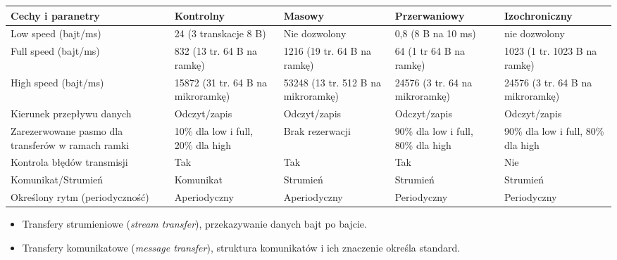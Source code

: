 		\begin{table}[h]
			\begin{tabular}{|p{4cm}|p{3cm}|p{3cm}|p{3cm}|p{3cm}|}
				\hline
				\textbf{Cechy i paranetry} & \textbf{Kontrolny}	   & \textbf{Masowy} & \textbf{Przerwaniowy} & \textbf{Izochroniczny} \\ \hline
				Low speed (bajt/ms)  & 24 (3 transkacje 8 B)        & Nie dozwolony      			& 0,8 (8 B na 10 ms)		& nie dozwolony						\\ \hline
				Full speed (bajt/ms) & 832 (13 tr. 64 B na ramkę)   & 1216 (19 tr. 64 B na ramkę)   & 64 (1 tr 64 B na ramkę)	& 1023 (1 tr. 1023 B na ramkę)		\\ \hline
				High speed (bajt/ms) & 15872 (31 tr. 64 B na mikroramkę) & 53248 (13 tr. 512 B na mikroramkę) & 24576 (3 tr. 64 na mikroramkę)	& 24576 (3 tr. 64 B na mikroramkę)	\\ \hline
				Kierunek przepływu danych & Odczyt/zapis            & Odczyt/zapis       			& Odczyt/zapis		& Odczyt/zapis					\\ \hline
				Zarezerwowane pasmo  dla transferów w ramach ramki & 10\% dla low i full, 20\% dla high   & Brak rezerwacji  & 90\% dla low i full, 80\% dla high	& 90\% dla low i full, 80\% dla high	\\ \hline
				Kontrola błędów transmisji & Tak                	& Tak & Tak	& Nie	\\ \hline
				Komunikat/Strumień  & Komunikat		               & Strumień & Strumień   & Strumień	\\ \hline
				Określony rytm (periodyczność) & Aperiodyczny        & Aperiodyczny    & Periodyczny   & Periodyczny	\\ \hline
				\end{tabular}
		\end{table}
				\begin{itemize}
					\item Transfery strumieniowe (\emph{stream transfer}), przekazywanie danych bajt po bajcie.
					\item Transfery komunikatowe (\emph{message transfer}), struktura komunikatów i ich znaczenie określa standard.
				\end{itemize}
				
